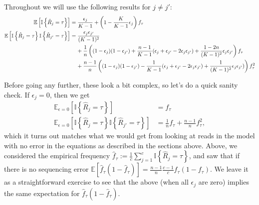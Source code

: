 \documentclass[letterpaper,fontsize=9pt,DIV=12]{scrartcl}
\begin{document}
Throughout we will use the following results for $j\ne j'$:
\begin{align}
\mathbb{E}\left[\mathbb{I}\left\{\hat{R}_j = \tau\right\}\right] &= \frac{\epsilon_j}{K-1} + \left(1 - \frac{K}{K-1} \epsilon_j\right)f_\tau \label{eq:first_moment}\\
\mathbb{E}\left[\mathbb{I}\left\{\hat{R}_j = \tau\right\}\mathbb{I}\left\{\hat{R}_{j'} = \tau\right\}\right] &= \frac{\epsilon_j\epsilon_{j'}}{(K-1)^2} \nonumber \\&\hspace{0.4cm}+ \frac{1}{n}\left((1-\epsilon_j)(1-\epsilon_{j'}) + \frac{n-1}{K-1}(\epsilon_j + \epsilon_{j'} - 2\epsilon_j\epsilon_{j'}) + \frac{1-2n}{(K-1)^2}\epsilon_j\epsilon_{j'}\right) f_\tau \label{eq:second_moment} \\&\hspace{0.4cm}+ \frac{n-1}{n}\left((1-\epsilon_j)(1-\epsilon_{j'}) - \frac{1}{K-1}(\epsilon_j + \epsilon_{j'} - 2\epsilon_j\epsilon_{j'}) + \frac{1}{(K-1)^2}\epsilon_j\epsilon_{j'})\right) f_\tau^2 \nonumber
\end{align}

Before going any further, these look a bit complex, so let's do a quick sanity check.  If $\epsilon_j = 0$, then we get
\begin{align*}
\mathbb{E}_{\epsilon=0}\left[\mathbb{I}\left\{\hat{R}_j = \tau\right\}\right] &= f_\tau\\
\mathbb{E}_{\epsilon=0}\left[\mathbb{I}\left\{\hat{R}_j = \tau\right\}\mathbb{I}\left\{\hat{R}_{j'} = \tau\right\}\right] &= \frac{1}{n}f_\tau + \frac{n-1}{n} f_\tau^2,
\end{align*}
which it turns out matches what we would get from looking at reads in the model with no error in the equations as described in the sections above.  Above, we considered the empirical frequency $\widehat{f}_\tau := \frac{1}{c}\sum_{j=1}^c \mathbb{I}\left\{\hat{R}_j = \tau\right\}$, and saw that if there is no sequencing error $\mathbb{E}\left[\widehat{f}_\tau(1-\widehat{f}_\tau)\right] = \frac{n-1}{n}\frac{c-1}{c}f_\tau(1-f_\tau)$.  We leave it as a straightforward exercise to see that the above (when all $\epsilon_j$ are zero) implies the same expectation for $\widehat{f}_\tau(1-\widehat{f}_\tau)$.
\end{document}
